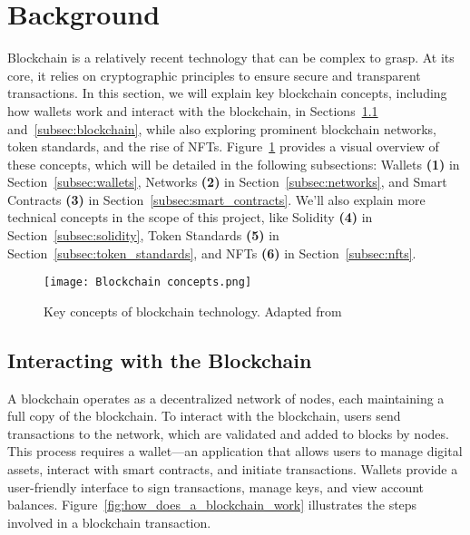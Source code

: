 \section{Background}\label{sec:background}

Blockchain is a relatively recent technology that can be complex to grasp. At
its core, it relies on cryptographic principles to ensure secure and
transparent transactions. In this section, we will explain key blockchain
concepts, including how wallets work and interact with the blockchain, in
Sections~\ref{subsec:interacting_with_the_blockchain}
and~\ref{subsec:blockchain}, while also exploring prominent blockchain
networks, token standards, and the rise of NFTs.
Figure~\ref{fig:blockchain_concepts} provides a visual overview of these
concepts, which will be detailed in the following subsections: Wallets
\textbf{(1)} in Section~\ref{subsec:wallets}, Networks \textbf{(2)} in
Section~\ref{subsec:networks}, and Smart Contracts \textbf{(3)} in
Section~\ref{subsec:smart_contracts}. We'll also explain more technical
concepts in the scope of this project, like Solidity \textbf{(4)} in
Section~\ref{subsec:solidity}, Token Standards \textbf{(5)} in
Section~\ref{subsec:token_standards}, and NFTs \textbf{(6)} in
Section~\ref{subsec:nfts}.

\begin{figure}[H]
    \centering
    \texttt{[image: Blockchain concepts.png]}
    \caption[Key concepts of blockchain technology]{Key concepts of blockchain technology. Adapted from~\cite{blockchain_concepts}}\label{fig:blockchain_concepts}
\end{figure}

\subsection{Interacting with the Blockchain}\label{subsec:interacting_with_the_blockchain}

A blockchain operates as a decentralized network of nodes, each maintaining a
full copy of the blockchain. To interact with the blockchain, users send
transactions to the network, which are validated and added to blocks by nodes.
This process requires a wallet—an application that allows users to manage
digital assets, interact with smart contracts, and initiate transactions.
Wallets provide a user-friendly interface to sign transactions, manage keys,
and view account balances. Figure~\ref{fig:how_does_a_blockchain_work}
illustrates the steps involved in a blockchain transaction.

